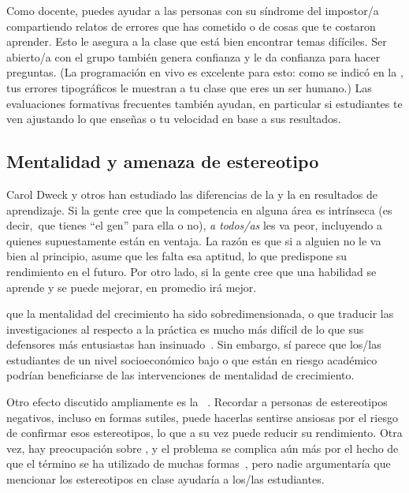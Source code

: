 Como docente,
puedes ayudar a las personas con su síndrome del impostor/a
compartiendo relatos de errores que has cometido o de cosas que te costaron aprender.
Esto le asegura a la clase que está bien encontrar temas difíciles.
Ser abierto/a con el grupo también genera confianza
y le da confianza para hacer preguntas.
(La programación en vivo es excelente para esto:
como se indicó en la ,
tus errores tipográficos le muestran a tu clase que eres un ser humano.)
Las evaluaciones formativas frecuentes también ayudan,
en particular si estudiantes te ven ajustando lo que enseñas o tu velocidad
en base a sus resultados.

\subsection*{Mentalidad y amenaza de estereotipo}

Carol Dweck y otros
han estudiado las diferencias de la 
y la  en resultados de aprendizaje.
Si la gente cree que la competencia en alguna área es intrínseca
(es decir,\ que tienes ``el gen'' para ella o no),
\emph{a todos/as} les va peor,
incluyendo a quienes supuestamente están en ventaja.
La razón es que si a alguien no le va bien al principio,
asume que les falta esa aptitud,
lo que predispone su rendimiento en el futuro.
Por otro lado,
si la gente cree que una habilidad se aprende y se puede mejorar,
en promedio irá mejor.

que la mentalidad del crecimiento ha sido sobredimensionada,
o que traducir las investigaciones al respecto a la práctica
es mucho más difícil
de lo que sus defensores más entusiastas han insinuado~\cite{Sisk2018}.
Sin embargo,
sí parece que los/las estudiantes de un nivel socioeconómico bajo o que están en riesgo académico podrían beneficiarse de las intervenciones de mentalidad de crecimiento.

Otro efecto discutido ampliamente es la ~\cite{Stee2011}.
Recordar a personas de estereotipos negativos,
incluso en formas sutiles,
puede hacerlas sentirse ansiosas por el riesgo de confirmar esos estereotipos,
lo que a su vez puede reducir su rendimiento.
Otra vez,
hay preocupación sobre
,
y el problema se complica aún más por el hecho de que el término se ha utilizado de muchas formas~\cite{Shap2007},
pero nadie argumentaría que mencionar los estereotipos en clase ayudaría a los/las estudiantes.

